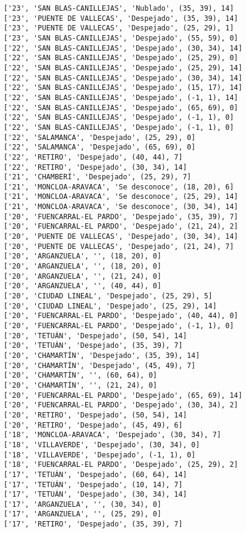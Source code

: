\documentclass[11pt]{article}
\begin{document}
\begin{Verbatim}[commandchars=\\\{\}]
['23', 'SAN BLAS-CANILLEJAS', 'Nublado', (35, 39), 14]
['23', 'PUENTE DE VALLECAS', 'Despejado', (35, 39), 14]
['23', 'PUENTE DE VALLECAS', 'Despejado', (25, 29), 1]
['23', 'SAN BLAS-CANILLEJAS', 'Despejado', (55, 59), 0]
['22', 'SAN BLAS-CANILLEJAS', 'Despejado', (30, 34), 14]
['22', 'SAN BLAS-CANILLEJAS', 'Despejado', (25, 29), 0]
['22', 'SAN BLAS-CANILLEJAS', 'Despejado', (25, 29), 14]
['22', 'SAN BLAS-CANILLEJAS', 'Despejado', (30, 34), 14]
['22', 'SAN BLAS-CANILLEJAS', 'Despejado', (15, 17), 14]
['22', 'SAN BLAS-CANILLEJAS', 'Despejado', (-1, 1), 14]
['22', 'SAN BLAS-CANILLEJAS', 'Despejado', (65, 69), 0]
['22', 'SAN BLAS-CANILLEJAS', 'Despejado', (-1, 1), 0]
['22', 'SAN BLAS-CANILLEJAS', 'Despejado', (-1, 1), 0]
['22', 'SALAMANCA', 'Despejado', (25, 29), 0]
['22', 'SALAMANCA', 'Despejado', (65, 69), 0]
['22', 'RETIRO', 'Despejado', (40, 44), 7]
['22', 'RETIRO', 'Despejado', (30, 34), 14]
['21', 'CHAMBERÍ', 'Despejado', (25, 29), 7]
['21', 'MONCLOA-ARAVACA', 'Se desconoce', (18, 20), 6]
['21', 'MONCLOA-ARAVACA', 'Se desconoce', (25, 29), 14]
['21', 'MONCLOA-ARAVACA', 'Se desconoce', (30, 34), 14]
['20', 'FUENCARRAL-EL PARDO', 'Despejado', (35, 39), 7]
['20', 'FUENCARRAL-EL PARDO', 'Despejado', (21, 24), 2]
['20', 'PUENTE DE VALLECAS', 'Despejado', (30, 34), 14]
['20', 'PUENTE DE VALLECAS', 'Despejado', (21, 24), 7]
['20', 'ARGANZUELA', '', (18, 20), 0]
['20', 'ARGANZUELA', '', (18, 20), 0]
['20', 'ARGANZUELA', '', (21, 24), 0]
['20', 'ARGANZUELA', '', (40, 44), 0]
['20', 'CIUDAD LINEAL', 'Despejado', (25, 29), 5]
['20', 'CIUDAD LINEAL', 'Despejado', (25, 29), 14]
['20', 'FUENCARRAL-EL PARDO', 'Despejado', (40, 44), 0]
['20', 'FUENCARRAL-EL PARDO', 'Despejado', (-1, 1), 0]
['20', 'TETUÁN', 'Despejado', (50, 54), 14]
['20', 'TETUÁN', 'Despejado', (35, 39), 7]
['20', 'CHAMARTÍN', 'Despejado', (35, 39), 14]
['20', 'CHAMARTÍN', 'Despejado', (45, 49), 7]
['20', 'CHAMARTÍN', '', (60, 64), 0]
['20', 'CHAMARTÍN', '', (21, 24), 0]
['20', 'FUENCARRAL-EL PARDO', 'Despejado', (65, 69), 14]
['20', 'FUENCARRAL-EL PARDO', 'Despejado', (30, 34), 2]
['20', 'RETIRO', 'Despejado', (50, 54), 14]
['20', 'RETIRO', 'Despejado', (45, 49), 6]
['18', 'MONCLOA-ARAVACA', 'Despejado', (30, 34), 7]
['18', 'VILLAVERDE', 'Despejado', (30, 34), 0]
['18', 'VILLAVERDE', 'Despejado', (-1, 1), 0]
['18', 'FUENCARRAL-EL PARDO', 'Despejado', (25, 29), 2]
['17', 'TETUÁN', 'Despejado', (60, 64), 14]
['17', 'TETUÁN', 'Despejado', (10, 14), 7]
['17', 'TETUÁN', 'Despejado', (30, 34), 14]
['17', 'ARGANZUELA', '', (30, 34), 0]
['17', 'ARGANZUELA', '', (25, 29), 0]
['17', 'RETIRO', 'Despejado', (35, 39), 7]

\end{Verbatim}
\end{document}
